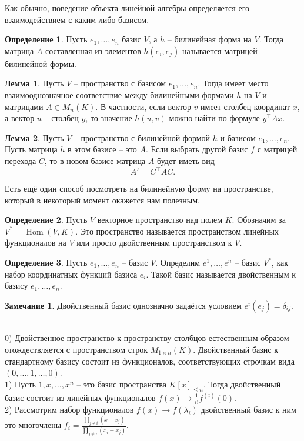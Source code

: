 \documentclass[10pt,a4paper,oneside]{book} %
\theoremstyle{definition}
\newtheorem*{rem}{Замечание}
\newtheorem*{defn}{Определение}
\newtheorem{lem}{Лемма}
\newcommand{\Hom}{\operatorname{Hom}}
\def\exm{\noindent {\bf Примеры:}}
\def\dfn{\begin{defn}}
\def\edfn{\end{defn}}
\def\lm{\begin{lem}}
\def\elm{\end{lem}}
\def\rm{\begin{rem}}
\def\erm{\end{rem}}
\begin{document}
Как обычно, поведение объекта линейной алгебры определяется его взаимодействием с каким-либо базисом.

\dfn Пусть $e_1, \dots, e_n$ базис $V$, а $h$ -- билинейная форма на $V$. Тогда матрица $A$ составленная из элементов $h(e_i,e_j)$ называется матрицей билинейной формы.
\edfn

\lm Пусть $V$ -- пространство с  базисом $e_1,\dots,e_n$. Тогда имеет место взаимооднозначное соответствие между билинейными формами $h$ на $V$ и матрицами  $A\in M_n(K)$. В частности, если вектор $v$ имеет столбец координат $x$, а вектор $u$ -- столбец $y$, то значение $h(u,v)$ можно найти по формуле $y^{\top}Ax$.
\elm

\lm Пусть $V$ -- пространство с билинейной формой $h$ и базисом $e_1,\dots,e_n$. Пусть матрица $h$ в этом базисе -- это $A$. Если выбрать другой базис $f$ с матрицей перехода $C$, то в новом базисе матрица $A$ будет иметь вид 
$$A'=C^{\top}AC.$$
\elm

Есть ещё один способ посмотреть на билинейную форму на пространстве, который в некоторый момент окажется нам полезным.


\begin{defn} Пусть $V$ векторное пространство над полем $K$. Обозначим за $V^{*}=\Hom(V,K)$. Это пространство называется пространством линейных функционалов на $V$ или просто двойственным пространством к $V$. 
\end{defn}




\dfn Пусть $e_1,\dots,e_n$ -- базис $V$. Определим $e^1,\dots, e^n$ -- базис $V^*$, как набор координатных функций базиса $e_i$. Такой базис называется двойственным к базису $e_1,\dots,e_n$. 
\edfn

\rm Двойственный базис однозначно задаётся условием $e^i(e_j)=\delta_{ij}$.
\erm

\exm\\
0) Двойственное пространство к пространству столбцов естественным образом отождествляется с пространством строк $M_{1\times n}(K)$. Двойственный базис к стандартному базису состоит из функционалов, соответствующих строчкам вида $(0,\dots, 1, \dots, 0)$.\\ 
1) Пусть $1,x,\dots, x^n$ -- это базис пространства $K[x]_{\leq n}$. Тогда двойственный базис состоит из линейных функционалов $f(x)\to \frac{1}{i!}f^{(i)}(0)$.\\
2) Рассмотрим набор функционалов $f(x)\to f(\lambda_i)$ двойственный базис к ним это многочлены $f_i=\frac{\prod_{j\neq i} (x-x_j)}{\prod_{j\neq i}{(x_i-x_j)}}$.
\end{document}
